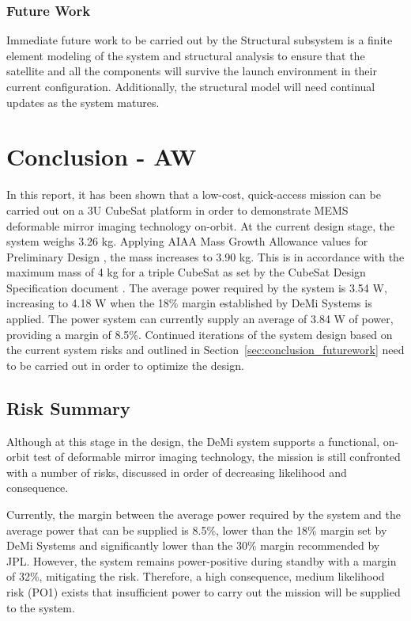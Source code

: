 \documentclass[12pt]{article}
\begin{document}
\subsubsection{Future Work}
Immediate future work to be carried out by the Structural subsystem is a finite element modeling of the system and structural analysis to ensure that the satellite and all the components will survive the launch environment in their current configuration. Additionally, the structural model will need continual updates as the system matures.


\section{Conclusion - AW}

In this report, it has been shown that a low-cost, quick-access mission can be carried out on a 3U CubeSat platform in order to demonstrate MEMS deformable mirror imaging technology on-orbit.  At the current design stage, the system weighs 3.26 kg.  Applying AIAA Mass Growth Allowance values for Preliminary Design \cite{mission_aiaa}, the mass increases to 3.90 kg.  This is in accordance with the maximum mass of 4 kg for a triple CubeSat as set by the CubeSat Design Specification document \cite{cubesat-specs}.  The average power required by the system is 3.54 W, increasing to 4.18 W when the 18\% margin established by DeMi Systems is applied.  The power system can currently supply an average of 3.84 W of power, providing a margin of 8.5\%.   Continued iterations of the system design based on the current system risks and outlined in Section~\ref{sec:conclusion_futurework} need to be carried out in order to optimize the design. 

		\subsection{Risk Summary}

Although at this stage in the design, the DeMi system supports a functional, on-orbit test of deformable mirror imaging technology, the mission is still confronted with a number of risks, discussed in order of decreasing likelihood and consequence.  

Currently, the margin between the average power required by the system and the average power that can be supplied is 8.5\%, lower than the 18\% margin set by DeMi Systems and significantly lower than the 30\% margin recommended by JPL.  However, the system remains power-positive during standby with a margin of 32\%, mitigating the risk.  Therefore, a high consequence, medium likelihood risk (PO1) exists that insufficient power to carry out the mission will be supplied to the system. 
\end{document}

